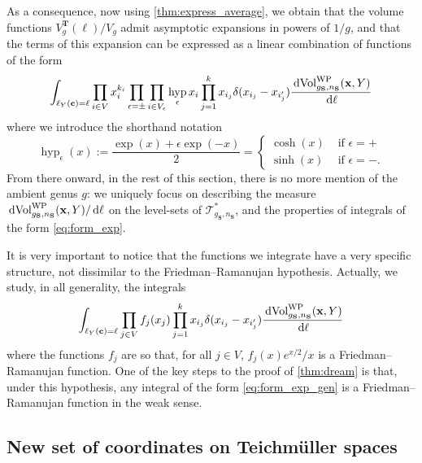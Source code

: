 \documentclass[12pt,twoside]{article}
\theoremstyle{theorem}
\theoremstyle{remark}
\theoremstyle{definition}
\theoremstyle{example}
\renewcommand{\d}{\, \mathrm{d}}
\newcommand{\x}{\mathbf{x}}
\newcommand{\1}[1]{\mathds{1}_{#1}}
\let\div\relax
\newcommand{\div}[1]{\left(\frac{#1}{2}\right)}
\newcommand{\cT}{\mathcal{T}}
\newcommand{\g}{g_{\mathbf{S}}}
\newcommand{\n}{n_{\mathbf{S}}}
\newcommand{\Volwp}[1][g]{\mathrm{Vol}_{#1}^{\mathrm{\scriptsize{WP}}}}
\newcommand{\curve}{\mathbf{c}}
\newcommand{\type}{\mathbf{T}}
\DeclareMathOperator{\hyp}{hyp}
\begin{document}
  As a consequence, now using \cref{thm:express_average}, we obtain that the volume functions
  $V_g^\type(\ell)/V_g$ admit asymptotic expansions in powers of $1/g$, and that the terms of this
  expansion can be expressed as a linear combination of functions of the form
  \begin{equation}
    \label{eq:form_exp}
    \int_{\ell_Y(\curve)=\ell}
    \prod_{i \in V} x_i^{k_i}
    \prod_{\epsilon = \pm}
      \prod_{i \in V_\epsilon} \hyp_\epsilon \div{x_i}
      \prod_{j=1}^k x_{i_j} \delta(x_{i_j}-x_{i_j'})
      \frac{\d \Volwp[\g,\n](\x,Y)}{\d \ell}
  \end{equation}
  where we introduce the shorthand notation
  \begin{equation}
    \label{eq:hyp}
    \hyp_\epsilon(x) :=
    \frac{\exp(x) + \epsilon \exp(-x)}{2}
    =
    \begin{cases}
      \cosh(x) & \text{ if } \epsilon = + \\
      \sinh(x) & \text{ if } \epsilon = -.
    \end{cases}
  \end{equation}
  From there onward, in the rest of this section, there is no more mention of the ambient genus
  $g$: we uniquely focus on describing the measure $\d \Volwp[\g,\n](\x,Y) / \d \ell$ on the
  level-sets of $\cT_{\g,\n}^*$, and the properties of integrals of the form \eqref{eq:form_exp}.

  It is very important to notice that the functions we integrate have a very specific structure, not
  dissimilar to the Friedman--Ramanujan hypothesis. Actually, we study, in all generality, the
  integrals
  \begin{equation}
    \label{eq:form_exp_gen}
    \int_{\ell_Y(\curve)=\ell}
    \prod_{j \in V} f_j(x_j)
    \prod_{j=1}^k x_{i_j} \delta(x_{i_j}-x_{i_j'})
    \frac{\d \Volwp[\g,\n](\x,Y)}{\d \ell}
  \end{equation}
  where the functions $f_j$ are so that, for all $j \in V$, $f_j(x)e^{x/2}/x$ is a
  Friedman--Ramanujan function. One of the key steps to the proof of \cref{thm:dream} is that, under
  this hypothesis, any integral of the form \eqref{eq:form_exp_gen} is a Friedman--Ramanujan
  function in the weak sense.
  
\subsection{New set of coordinates on Teichm\"uller spaces}
\label{sec:expr-weil-peterss}
\end{document}
